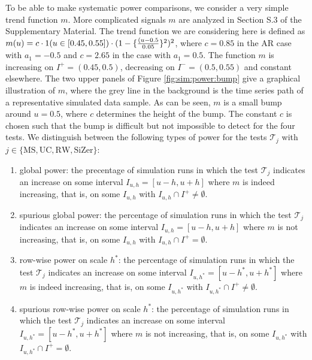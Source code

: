 To be able to make systematic power comparisons, we consider a very simple trend function $m$. More complicated signals $m$ are analyzed in Section S.3 of the Supplementary Material. The trend function we are considering here is defined as $m(u) = c \cdot 1(u \in [0.45,0.55]) \cdot (1 - \{\frac{(u-0.5}{0.05}\}^2)^2$, where $c = 0.85$ in the AR case with $a_1 = -0.5$ and $c=2.65$ in the case with $a_1=0.5$. The function $m$ is increasing on $I^{+} = (0.45,0.5)$, decreasing on $I^{-} = (0.5,0.55)$ and constant elsewhere. The two upper panels of Figure \ref{fig:sim:power:bump} give a graphical illustration of $m$, where the grey line in the background is the time series path of a representative simulated data sample. As can be seen, $m$ is a small bump around $u=0.5$, where $c$ determines the height of the bump. The constant $c$ is chosen such that the bump is difficult but not impossible to detect for the four tests. We distinguish between the following types of power for the tests $\mathcal{T}_j$ with $j \in \{ \text{MS}, \text{UC}, \text{RW}, \text{SiZer} \}$: 
\begin{enumerate}[label=(\roman*),leftmargin=0.85cm]
\item global power: the precentage of simulation runs in which the test $\mathcal{T}_j$ indicates an increase on some interval $I_{u,h}=[u-h,u+h]$ where $m$ is indeed increasing, that is, on some $I_{u,h}$ with $I_{u,h} \cap I^+ \neq \emptyset$.
\item spurious global power: the percentage of simulation runs in which the test $\mathcal{T}_j$ indicates an increase on some interval $I_{u,h}=[u-h,u+h]$ where $m$ is not increasing, that is, on some $I_{u,h}$ with $I_{u,h} \cap I^+ = \emptyset$.
\item row-wise power on scale $h^*$: the percentage of simulation runs in which the test $\mathcal{T}_j$ indicates an increase on some interval $I_{u,h^*}=[u-h^*,u+h^*]$ where $m$ is indeed increasing, that is, on some $I_{u,h^*}$ with $I_{u,h^*} \cap I^+ \neq \emptyset$.
\item spurious row-wise power on scale $h^*$: the percentage of simulation runs in which the test $\mathcal{T}_j$ indicates an increase on some interval $I_{u,h^*}=[u-h^*,u+h^*]$ where $m$ is not increasing, that is, on some $I_{u,h^*}$ with $I_{u,h^*} \cap I^+ = \emptyset$.
\end{enumerate}


